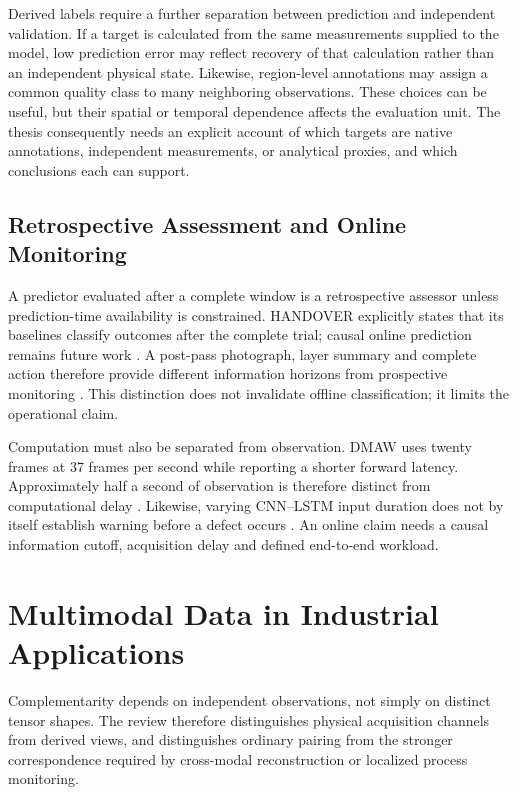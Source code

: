 Derived labels require a further separation between prediction and independent validation. If a target is calculated from the same measurements supplied to the model, low prediction error may reflect recovery of that calculation rather than an independent physical state. Likewise, region-level annotations may assign a common quality class to many neighboring observations. These choices can be useful, but their spatial or temporal dependence affects the evaluation unit. The thesis consequently needs an explicit account of which targets are native annotations, independent measurements, or analytical proxies, and which conclusions each can support.

\subsection{Retrospective Assessment and Online Monitoring}
A predictor evaluated after a complete window is a retrospective assessor unless prediction-time availability is constrained. HANDOVER explicitly states that its baselines classify outcomes after the complete trial; causal online prediction remains future work \citep[PDF p.~7, Section~VI]{Thoduka2024Handover}. A post-pass photograph, layer summary and complete action therefore provide different information horizons from prospective monitoring \citep{P045,Petrich2021Multimodal}. This distinction does not invalidate offline classification; it limits the operational claim.

Computation must also be separated from observation. DMAW uses twenty frames at 37 frames per second while reporting a shorter forward latency. Approximately half a second of observation is therefore distinct from computational delay \citep[PDF pp.~6--7]{P003}. Likewise, varying CNN--LSTM input duration does not by itself establish warning before a defect occurs \citep{Pandiyan2022Deep}. An online claim needs a causal information cutoff, acquisition delay and defined end-to-end workload.

\section{Multimodal Data in Industrial Applications}

Complementarity depends on independent observations, not simply on distinct tensor shapes. The review therefore distinguishes physical acquisition channels from derived views, and distinguishes ordinary pairing from the stronger correspondence required by cross-modal reconstruction or localized process monitoring.

